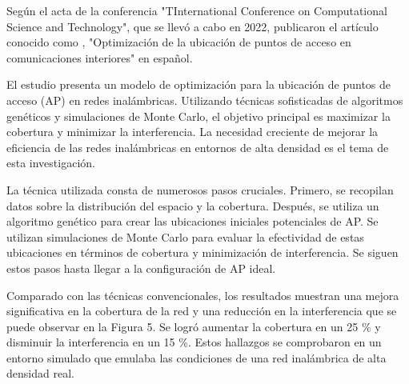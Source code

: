 Según el acta de la conferencia "TInternational Conference on Computational Science and Technology", que se llevó a cabo en 2022, \cite{pr_alathari2023optaps} publicaron el artículo conocido como , "Optimización de la ubicación de puntos de acceso en comunicaciones interiores" en español.

El estudio presenta un modelo de optimización para la ubicación de puntos de acceso (AP) en redes inalámbricas. Utilizando técnicas sofisticadas de algoritmos genéticos y simulaciones de Monte Carlo, el objetivo principal es maximizar la cobertura y minimizar la interferencia. La necesidad creciente de mejorar la eficiencia de las redes inalámbricas en entornos de alta densidad es el tema de esta investigación.

La técnica utilizada consta de numerosos pasos cruciales. Primero, se recopilan datos sobre la distribución del espacio y la cobertura. Después, se utiliza un algoritmo genético para crear las ubicaciones iniciales potenciales de AP. Se utilizan simulaciones de Monte Carlo para evaluar la efectividad de estas ubicaciones en términos de cobertura y minimización de interferencia. Se siguen estos pasos hasta llegar a la configuración de AP ideal.

Comparado con las técnicas convencionales, los resultados muestran una mejora significativa en la cobertura de la red y una reducción en la interferencia que se puede observar en la Figura 5. Se logró aumentar la cobertura en un 25 \% y disminuir la interferencia en un 15 \%. Estos hallazgos se comprobaron en un entorno simulado que emulaba las condiciones de una red inalámbrica de alta densidad real.

